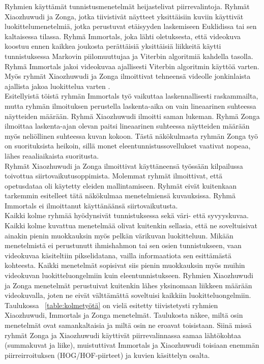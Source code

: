 Ryhmien käyttämät tunnistusmenetelmät heijastelivat piirrevalintoja. Ryhmät Xiaozhuwudi ja Zonga, jotka tiivistivät näytteet 
yksittäisiin kuviin käyttivät luokittelumenetelmiä, jotka perustuvat etäisyyden laskemiseen 
Euklidissa tai sen kaltaisessa tilassa. Ryhmä Immortals, joka lähti oletuksesta, että videokuva koostuu ennen kaikkea joukosta perättäisiä 
yksittäisiä liikkeitä käytti tunnistuksessa Markovin piilomuuttujaa ja Viterbin algoritmiä kahdella tasolla. Ryhmä Immortals jakoi videokuvaa 
ajallisesti Viterbin algoritmin käyttöä varten. Myös ryhmät Xiaozhuwudi ja Zonga ilmoittivat tehneensä videolle 
jonkinlaista ajallista jakoa luokittelua varten \citep{firstround}. \\

Esitellyistä töistä ryhmän Immortals työ vaikuttaa laskennallisesti raskammailta, mutta ryhmän ilmoituksen perustella laskenta-aika on vain lineaarinen suhteessa 
näytteiden määrään. Ryhmä Xiaozhuwudi ilmoitti saman lukeman. Ryhmä Zonga ilmoittaa laskenta-ajan olevan paitsi lineaarinen suhteessa näytteiden määrään myös
neliöllinen suhteessa kuvan kokoon. \citep{firstround} Tästä näkökulmasta ryhmän Zonga työ on suorituksista heikoin, sillä monet eleentunnistussovellukset vaativat 
nopeaa, lähes reaaliaikaista suoritusta. \\

Ryhmät Xiaozhuwudi ja Zonga ilmoittivat käyttäneensä työssään kilpailussa toivottua siirtovaikutusoppimista. Molemmat ryhmät ilmoittivat,
että opetusdataa oli käytetty eleiden mallintamiseen. Ryhmät eivät kuitenkaan tarkemmin esitelleet tätä näkökulmaa menetelmiensä kuvauksissa.
Ryhmä Immortals ei ilmoittanut käyttänäänsä siirtovaikutusta. \citep{firstround}\\

Kaikki kolme ryhmää hyödynsivät tunnistuksessa sekä väri- että syvyyskuvaa. Kaikki kolme kuvattua menetelmää olivat kuitenkin sellasia, 
että ne soveltuisivat ainakin pienin muokkauksin myös pelkän värikuvan luokitteluun. Mikään menetelmistä ei perustunutt ihmishahmon 
tai sen osien tunnistukseen, vaan videokuvaa käsiteltiin pikselidatana, vailla informaatiota sen esittämästä kohteesta.
Kaikki menetelmät sopisivat siis  pienin muokkauksin myös muihin videokuvan luokitteluongelmiin kuin eleentunnistukseen. Ryhmien Xiaozhuwudi ja Zonga 
menetelmät perustuivat kuitenkin lähes yksinomaan liikkeen määrään videokuvalla, joten ne eivät välttämättä soveltuisi 
kaikkiin luokitteluongelmiin.\\

Taulukossa ~\ref{table:kolmetyötä} on vielä esitetty tiivistetysti ryhmien Xiaozhuwudi, Immortals ja Zonga menetelmät.
Taulukosta näkee, miltä osin menetelmät ovat samankaltaisia ja miltä osin ne eroavat toisistaan. Siinä missä ryhmät
Zonga ja Xiaozhuwudi käyttivät piirrevalinnassa samaa lähtökohtaa (summakuvat ja liike), muistuttivat Immortals ja Xiaozhuwudi
toisiaan enemmän piirreirroituksen (HOG/HOF-piirteet) ja kuvien käsittelyn osalta. \\

